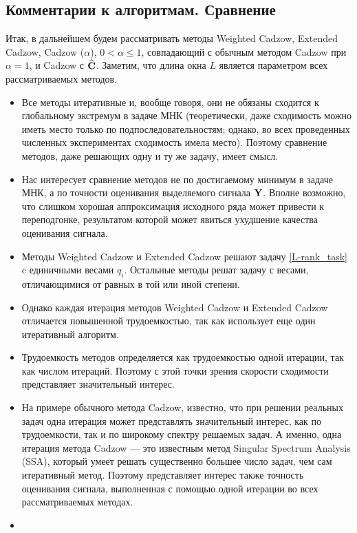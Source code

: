 \documentclass[12pt,a4paper,fleqn,leqno]{article}
\begin{document}
\subsection{Комментарии к алгоритмам. Сравнение}

Итак, в дальнейшем будем рассматривать методы
Weighted Cadzow, Extended Cadzow, Cadzow ($\alpha$), $0< \alpha \leq 1$, совпадающий с обычным методом Cadzow при $\alpha=1$,
и Cadzow с $\widehat {\mathbf{C}}$.
Заметим, что длина окна $L$ является параметром всех рассматриваемых методов.

\begin{itemize}
\item
Все методы итеративные и, вообще говоря, они не обязаны сходится к глобальному экстремум в задаче МНК  (теоретически, даже сходимость можно иметь место только по подпоследовательностям; однако, во всех проведенных численных экспериментах сходимость имела место). Поэтому сравнение методов, даже
решающих одну и ту же задачу, имеет смысл. 
\item
Нас интересует сравнение методов не по достигаемому минимум в задаче МНК, а по точности оценивания выделяемого сигнала $\mathbf{Y}$.
Вполне возможно, что слишком хорошая аппроксимация исходного ряда может привести к переподгонке, результатом которой
может явиться ухудшение качества оценивания сигнала.
\item
Методы Weighted Cadzow и Extended Cadzow решают задачу \eqref{L-rank_task} c единичными весами $q_i$. Остальные методы решат задачу с весами, отличающимися от равных в той или иной степени.
\item
Однако каждая итерация методов Weighted Cadzow и Extended Cadzow отличается повышенной трудоемкостью, так как использует
еще один итеративный алгоритм.
\item
Трудоемкость методов определяется как трудоемкостью одной итерации, так как числом итераций. Поэтому с этой точки зрения скорости сходимости представляет значительный интерес.
\item
На примере обычного метода Cadzow, известно, что при решении реальных задач одна итерация может представлять значительный интерес, как по трудоемкости, так и по широкому спектру решаемых задач. А именно, одна итерация метода Cadzow --- это известным метод Singular Spectrum Analysis (SSA), который умеет решать существенно большее число задач, чем сам итеративный метод. Поэтому представляет интерес также точность оценивания сигнала, выполненная с помощью одной итерации во всех рассматриваемых методах.
\item 

\end{itemize}
\end{document}
